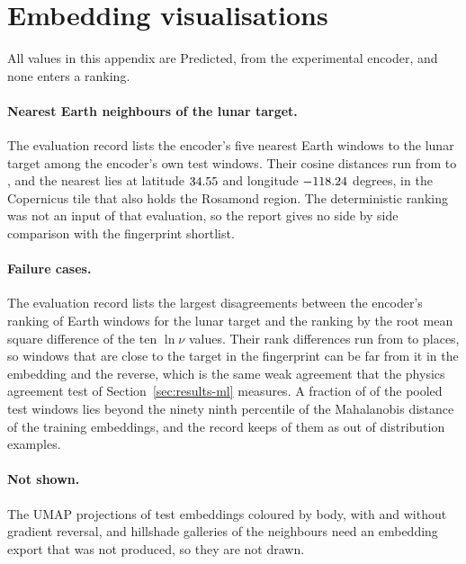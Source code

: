 \section{Embedding visualisations}
\label{sec:appendix-embeddings}

All values in this appendix are Predicted, from the experimental encoder, and none enters a ranking.

\paragraph{Nearest Earth neighbours of the lunar target.} The evaluation record lists the encoder's five
nearest Earth windows to the lunar target among the encoder's own test windows. Their cosine
distances run from \GalleryOneDist{} to \GalleryFiveDist, and the nearest lies at latitude
$34.55$ and longitude $-118.24$ degrees, in the Copernicus tile that also holds the
Rosamond region. The deterministic ranking was not an input of that evaluation, so the report gives
no side by side comparison with the fingerprint shortlist.

\paragraph{Failure cases.} The evaluation record lists the \FailureCount{} largest disagreements between the
encoder's ranking of Earth windows for the lunar target and the ranking by the root mean square
difference of the ten $\ln \nu$ values. Their rank differences run from
\FailureMinDisagreement{} to \FailureMaxDisagreement{} places, so windows that are close to the
target in the fingerprint can be far from it in the embedding and the reverse, which is the same
weak agreement that the physics agreement test of Section~\ref{sec:results-ml} measures. A fraction
of \OodFraction{} of the pooled test windows lies beyond the ninety ninth percentile of the
Mahalanobis distance of the training embeddings, and the record keeps \OodExamples{} of them as
out of distribution examples.

\paragraph{Not shown.} The UMAP projections \citep{mcinnes2018} of test embeddings coloured by body,
with and without gradient reversal, and hillshade galleries of the neighbours need an embedding
export that was not produced, so they are not drawn.
